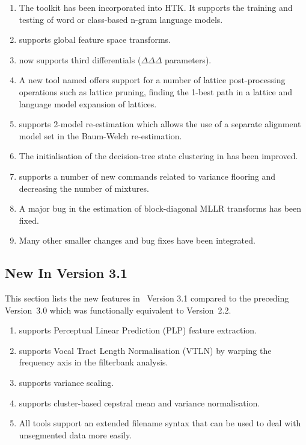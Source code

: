 \begin{enumerate}
\item The  toolkit has been incorporated into HTK. It
  supports the training and testing of word or class-based n-gram
  language models. 
\item {} supports global feature space transforms.
\item {} now supports third differentials
  ($\Delta\Delta\Delta$ parameters).
\item A new tool named  offers support for a number
  of lattice post-processing operations such as lattice pruning,
  finding the 1-best path in a lattice and language model expansion of
  lattices.
\item {} supports 2-model re-estimation which allows the
  use of a separate alignment model set in the Baum-Welch
  re-estimation.
\item The initialisation of the decision-tree state clustering in
   has been improved.
\item {} supports a number of new commands related to
  variance flooring and decreasing the number of mixtures.
\item A major bug in the estimation of block-diagonal MLLR transforms
  has been fixed.
\item Many other smaller changes and bug fixes have been integrated.
\end{enumerate}

\subsection{New In Version 3.1}{}

This  section lists the new
features in \HTK\ Version 3.1 compared to the preceding Version~3.0
which was functionally equivalent to Version~2.2.

\begin{enumerate}

\item {} supports Perceptual Linear Prediction (PLP) feature
  extraction.

\item {} supports Vocal Tract Length Normalisation (VTLN)
  by warping the frequency axis in the filterbank analysis.

\item {} supports variance scaling.

\item {} supports cluster-based cepstral mean and variance
  normalisation. 

\item All tools support an extended filename syntax that can be used
  to deal with unsegmented data more easily.

\end{enumerate}



